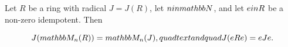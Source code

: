 Let $R$ be a ring with radical $J = J(R)$, let $n \\in \\mathbb{N}$, and let $e \\in R$ be a non-zero idempotent. Then

$$J(\\mathbb{M}_n(R)) = \\mathbb{M}_n(J), \\quad \\text{and} \\quad J(eRe) = eJe.$$
